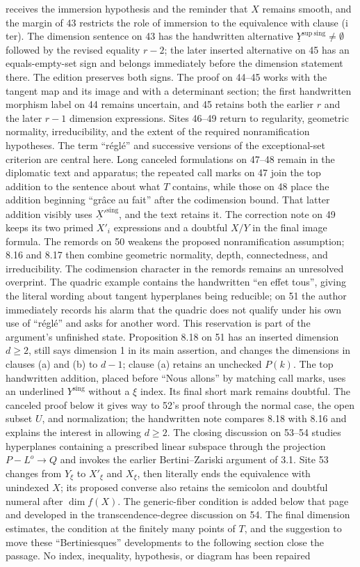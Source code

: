 \documentclass[10pt,a4paper]{article}
\begin{document}
receives the immersion hypothesis and the reminder that $X$ remains smooth, and the margin of 43 restricts the role of immersion to the equivalence with clause (i ter). The dimension sentence on 43 has the handwritten alternative $\underline{Y}^{\mathrm{sup\ sing}}\neq\emptyset$ followed by the revised equality $r-2$; the later inserted alternative on 45 has an equals-empty-set sign and belongs immediately before the dimension statement there. The edition preserves both signs. The proof on 44--45 works with the tangent map and its image and with a determinant section; the first handwritten morphism label on 44 remains uncertain, and 45 retains both the earlier $r$ and the later $r-1$ dimension expressions. Sites 46--49 return to regularity, geometric normality, irreducibility, and the extent of the required nonramification hypotheses. The term ``réglé'' and successive versions of the exceptional-set criterion are central here. Long canceled formulations on 47--48 remain in the diplomatic text and apparatus; the repeated call marks on 47 join the top addition to the sentence about what $T$ contains, while those on 48 place the addition beginning ``grâce au fait'' after the codimension bound. That latter addition visibly uses $\underline{X}'^{\mathrm{sing}}$, and the text retains it. The correction note on 49 keeps its two primed $X'_i$ expressions and a doubtful $X/Y$ in the final image formula. The remords on 50 weakens the proposed nonramification assumption; 8.16 and 8.17 then combine geometric normality, depth, connectedness, and irreducibility. The codimension character in the remords remains an unresolved overprint. The quadric example contains the handwritten ``en effet tous'', giving the literal wording about tangent hyperplanes being reducible; on 51 the author immediately records his alarm that the quadric does not qualify under his own use of ``réglé'' and asks for another word. This reservation is part of the argument's unfinished state. Proposition 8.18 on 51 has an inserted dimension $d\geq2$, still says dimension 1 in its main assertion, and changes the dimensions in clauses (a) and (b) to $d-1$; clause (a) retains an unchecked $P(k)$. The top handwritten addition, placed before ``Nous allons'' by matching call marks, uses an underlined $Y^{\mathrm{sing}}$ without a $\xi$ index. Its final short mark remains doubtful. The canceled proof below it gives way to 52's proof through the normal case, the open subset $U$, and normalization; the handwritten note compares 8.18 with 8.16 and explains the interest in allowing $d\geq2$. The closing discussion on 53--54 studies hyperplanes containing a prescribed linear subspace through the projection $P-L^o\to Q$ and invokes the earlier Bertini--Zariski argument of 3.1. Site 53 changes from $Y_\xi$ to $X'_\xi$ and $X_\xi$, then literally ends the equivalence with unindexed $X$; its proposed converse also retains the semicolon and doubtful numeral after $\dim f(X)$. The generic-fiber condition is added below that page and developed in the transcendence-degree discussion on 54. The final dimension estimates, the condition at the finitely many points of $T$, and the suggestion to move these ``Bertiniesques'' developments to the following section close the passage. No index, inequality, hypothesis, or diagram has been repaired 
\end{document}
